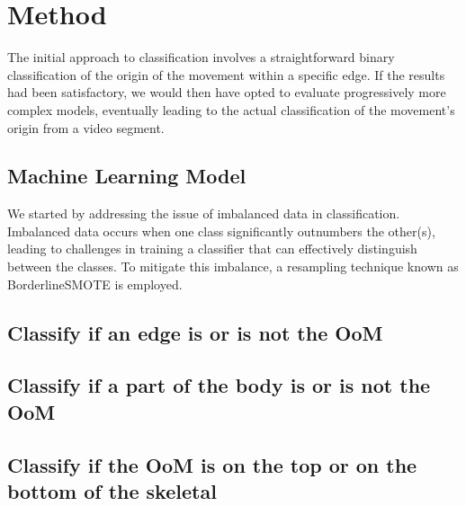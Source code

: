 \section{Method}

The initial approach to classification involves a straightforward binary classification of the origin of the movement within a specific edge.
If the results had been satisfactory, we would then have opted to evaluate progressively more complex models, eventually leading to the actual classification of the movement's origin from a video segment.

\subsection{Machine Learning Model}
We started by addressing the issue of imbalanced data in classification. Imbalanced data occurs when one class significantly outnumbers the other(s), leading to challenges in training a classifier that can effectively distinguish between the classes.
To mitigate this imbalance, a resampling technique known as BorderlineSMOTE is employed.

\subsection{Classify if an edge is or is not the OoM}

\subsection{Classify if a part of the body is or is not the OoM}

\subsection{Classify if the OoM is on the top or on the bottom of the skeletal}



